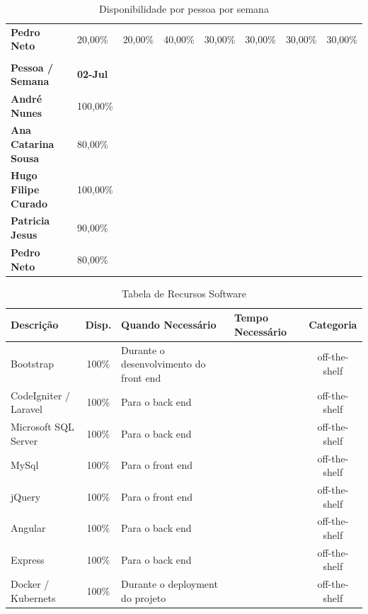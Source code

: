 \documentclass[a4paper]{report}
\begin{document}
\begin{table}[h]
\begin{tabular}{llllllll}
\multicolumn{1}{l|}{\textbf{Pedro Neto}} & \multicolumn{1}{l|}{20,00\%} & \multicolumn{1}{l|}{20,00\%} & \multicolumn{1}{l|}{40,00\%} & \multicolumn{1}{l|}{30,00\%} & \multicolumn{1}{l|}{30,00\%} & \multicolumn{1}{l|}{30,00\%} & 30,00\% \\
\textbf{} &  &  &  &  &  &  &  \\
\multicolumn{1}{l|}{\textbf{Pessoa / Semana}} & \textbf{02-Jul} &  &  &  &  &  &  \\ \cline{1-2}
\multicolumn{1}{l|}{\textbf{André Nunes}} & 100,00\% &  &  &  &  &  &  \\ \cline{1-2}
\multicolumn{1}{l|}{\textbf{Ana Catarina Sousa}} & 80,00\% &  &  &  &  &  &  \\ \cline{1-2}
\multicolumn{1}{l|}{\textbf{Hugo Filipe Curado}} & 100,00\% &  &  &  &  &  &  \\ \cline{1-2}
\multicolumn{1}{l|}{\textbf{Patricia Jesus}} & 90,00\% &  &  &  &  &  &  \\ \cline{1-2}
\multicolumn{1}{l|}{\textbf{Pedro Neto}} & 80,00\% &  &  &  &  &  & 
\end{tabular}
\caption{Disponibilidade por pessoa por semana}
\label{dppps}
\end{table}
\begin{table}[h]
\centering
\begin{tabularx}{\textwidth}{X|c|X|X|c}
\textbf{Descrição} & \textbf{Disp.} & \textbf{Quando Necessário} & \textbf{Tempo Necessário} & \textbf{Categoria} \\ \hline
Bootstrap & \multicolumn{1}{c|}{100\%} & Durante o desenvolvimento do front end &  & off-the-shelf \\ \hline
CodeIgniter / Laravel & 100\% & Para o back end &  & off-the-shelf \\ \hline
Microsoft SQL Server & \multicolumn{1}{c|}{100\%} & Para o back end &  & off-the-shelf \\ \hline
MySql & 100\% & Para o front end &  & off-the-shelf \\ \hline
jQuery & 100\% & Para o front end &  & off-the-shelf \\ \hline
Angular & 100\% & Para o back end &  & off-the-shelf \\ \hline
Express & 100\% & Para o back end &  & off-the-shelf \\ \hline
Docker / Kubernets & \multicolumn{1}{c|}{100\%} & Durante o deployment do projeto &  & off-the-shelf \\
\end{tabularx}
\caption{Tabela de Recursos Software}
\label{TabRS}
\end{table}
\end{document}
